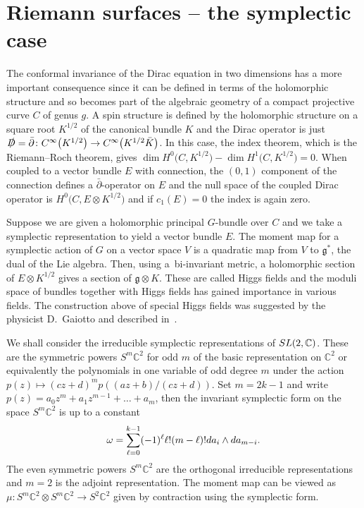 \documentclass[11pt]{article}
\numberwithin{equation}{section}
\newcommand{\lie}[1]{\mathfrak{#1}}
\newcommand{\C}{\mathbb{C}}
\begin{document}
\section{Riemann surfaces -- the symplectic case}\label{section3}
The conformal invariance of the Dirac equation in two dimensions has a more important consequence since it can be defined in terms of the holomorphic structure and so becomes part of the algebraic geometry of a compact projective curve $C$ of genus $g$. A spin structure is defined by the holomorphic structure on a square root $K^{1/2}$ of the canonical bundle $K$ and the Dirac operator is just $\slashed D=\bar\partial\colon C^{\infty}\big(K^{1/2}\big)\rightarrow C^{\infty}\big(K^{1/2}\bar K\big)$.
In this case, the index theorem, which is the Riemann--Roch theorem, gives $\dim H^0\big(C,K^{1/2}\big)-\dim H^1\big(C, K^{1/2}\big)=0$.
When coupled to a vector bundle $E$ with connection, the $(0,1)$ component of the connection defines a $\bar\partial$-operator on $E$ and the null space of the coupled Dirac operator is $H^0\big(C,E\otimes K^{1/2}\big)$ and if $c_1(E)=0$ the index is again zero.

Suppose we are given a holomorphic principal $G$-bundle over $C$ and we take a symplectic representation to yield a vector bundle $E$. The moment map for a symplectic action of $G$ on a vector space $V$ is a quadratic map from $V$ to $\lie{g}^*$, the dual of the Lie algebra. Then, using a~bi-invariant metric, a holomorphic section of $E\otimes K^{1/2}$ gives a section of $\lie{g}\otimes K$. These are called Higgs fields and the moduli space of bundles together with Higgs fields has gained importance in various fields. The construction above of special Higgs fields was suggested by the physicist D.~Gaiotto \cite{Gaiotto} and described in~\cite{Hitchin2}.

We shall consider the irreducible symplectic representations of ${\rm SL}(2,\C)$. These are the symmetric powers $S^m\C^2$ for odd $m$ of the basic representation on $\C^2$ or equivalently the polynomials in one variable of odd degree $m$ under the action
$p(z)\mapsto (cz+d)^mp((az+b)/(cz+d)).$
 Set $m=2k-1$ and write $p(z)=a_0z^m+a_1z^{m-1}+\dots+a_m$, then the invariant symplectic form on the space $S^m\C^2$ is up to a constant
\begin{equation}
\omega=\sum_{\ell=0}^{k-1}(-1)^{\ell}\ell!(m-\ell)!{\rm d}a_i\wedge {\rm d}a_{m-i}.\label{symp}
\end{equation}
The even symmetric powers $S^{m}\C^2$ are the orthogonal irreducible representations and $m=2$ is the adjoint representation. The moment map can be viewed as $\mu\colon S^m\C^2\otimes S^m\C^2\rightarrow S^2\C^2$ given by contraction using the symplectic form.
\end{document}

